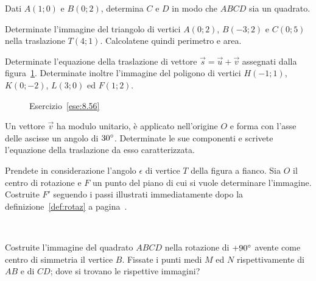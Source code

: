 \begin{esercizio}
\label{ese:8.54} %
Dati $A(1;0)$ e $B(0;2)$, determina $C$ e $D$ in modo che $ABCD$ sia un quadrato.
\end{esercizio}

\begin{esercizio}
\label{ese:8.55} %
Determinate l'immagine del triangolo di vertici $A(0;2)$, $B(-3;2)$ e $C(0;5)$ nella traslazione $T(4;1)$. Calcolatene quindi perimetro e area.
\end{esercizio}

\begin{esercizio}
\label{ese:8.56} %
Determinate l'equazione della traslazione di vettore $\vec{s}=\vec{u}+\vec{v}$ assegnati dalla figura~\ref{fig:ese8.56}. Determinate inoltre l'immagine del poligono di vertici $H(-1;1)$, $K(0;-2)$, $L(3;0)$ ed $F(1;2)$.
\end{esercizio}

\begin{figure}[!htb]
	\centering
	\caption{Esercizio~\ref{ese:8.56}}\label{fig:ese8.56}
\end{figure}\vspace{8pt}

\begin{esercizio}
\label{ese:8.57} %
Un vettore $\vec{v}$ ha modulo unitario, è applicato nell'origine $O$ e forma con l'asse delle ascisse un angolo di $30{}^{\circ}$. Determinate le sue componenti e scrivete l'equazione della traslazione da esso caratterizzata.
\end{esercizio}

\noindent\begin{minipage}{0.7\textwidth}\parindent15pt
\begin{esercizio}
\label{ese:8.58} %
Prendete in considerazione l'angolo $\epsilon$ di vertice $T$ della figura a fianco. Sia $O$ il centro di rotazione e $F$ un punto del piano di cui si vuole determinare l'immagine. Costruite $F'$ seguendo i passi illustrati immediatamente dopo la definizione~\ref{def:rotaz} a pagina~\pageref{def:rotaz}.
\end{esercizio}
\end{minipage}\hfil
\begin{minipage}{0.3\textwidth}
	\centering~~
\end{minipage}\vspace{8pt}

\begin{esercizio}
\label{ese:8.59} %
Costruite l'immagine del quadrato $ABCD$ nella rotazione di $+90{}^{\circ}$ avente come centro di simmetria il vertice $B$.
Fissate i punti medi $M$ ed $N$ rispettivamente di $AB$ e di $CD$; dove si trovano le rispettive immagini?
\end{esercizio}

